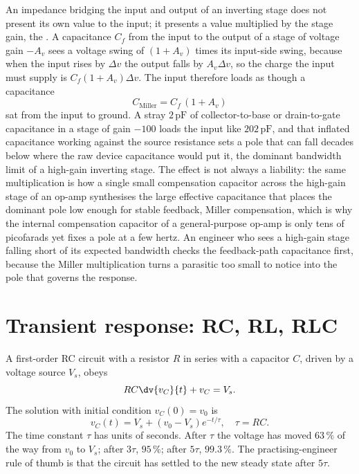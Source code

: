 \begin{mastery}
An impedance bridging the input and output of an inverting stage does not
present its own value to the input; it presents a value multiplied by the
stage gain, the . A capacitance $C_f$ from the input
to the output of a stage of voltage gain $-A_v$ sees a voltage swing of
$(1 + A_v)$ times its input-side swing, because when the input rises by
$\Delta v$ the output falls by $A_v\Delta v$, so the charge the input must
supply is $C_f(1 + A_v)\Delta v$. The input therefore loads as though a
capacitance
\[
C_{\text{Miller}} = C_f\,(1 + A_v)
\]
sat from the input to ground. A stray $2\,\si{\pico\farad}$ of
collector-to-base or drain-to-gate capacitance in a stage of gain $-100$
loads the input like $202\,\si{\pico\farad}$, and that inflated capacitance
working against the source resistance sets a pole that can fall decades below
where the raw device capacitance would put it, the dominant bandwidth limit of
a high-gain inverting stage. The effect is not always a liability: the same
multiplication is how a single small compensation capacitor across the
high-gain stage of an op-amp synthesises the large effective capacitance that
places the dominant pole low enough for stable feedback, Miller compensation,
which is why the internal compensation capacitor of a general-purpose op-amp
is only tens of picofarads yet fixes a pole at a few hertz. An engineer who
sees a high-gain stage falling short of its expected bandwidth checks the
feedback-path capacitance first, because the Miller multiplication turns a
parasitic too small to notice into the pole that governs the response.
\end{mastery}

\section{Transient response: RC, RL, RLC}
\label{sec:vol04ch09:transient}

A first-order RC circuit with a resistor $R$ in series with a
capacitor $C$, driven by a voltage source $V_{s}$, obeys
\[
RC\dv{v_{C}}{t} + v_{C} = V_{s}.
\]
The solution with initial condition $v_{C}(0) = v_{0}$ is
\[
v_{C}(t) = V_{s} + (v_{0}-V_{s})e^{-t/\tau}, \quad \tau = RC.
\]
The time constant $\tau$ has units of seconds. After $\tau$ the
voltage has moved $63\,\%$ of the way from $v_{0}$ to $V_{s}$; after
$3\tau$, $95\,\%$; after $5\tau$, $99.3\,\%$. The practising-engineer
rule of thumb is that the circuit has settled to the new steady state
after $5\tau$.

